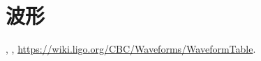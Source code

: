 \chapter{波形}

\href{https://lscsoft.docs.ligo.org/lalsuite/lalsimulation/group___l_a_l_sim_i_m_r__h.html}{}, \href{https://git.ligo.org/lscsoft/lalsuite-extra/-/tree/master/data/lalsimulation?ref_type=heads}{}, \url{https://wiki.ligo.org/CBC/Waveforms/WaveformTable}.
